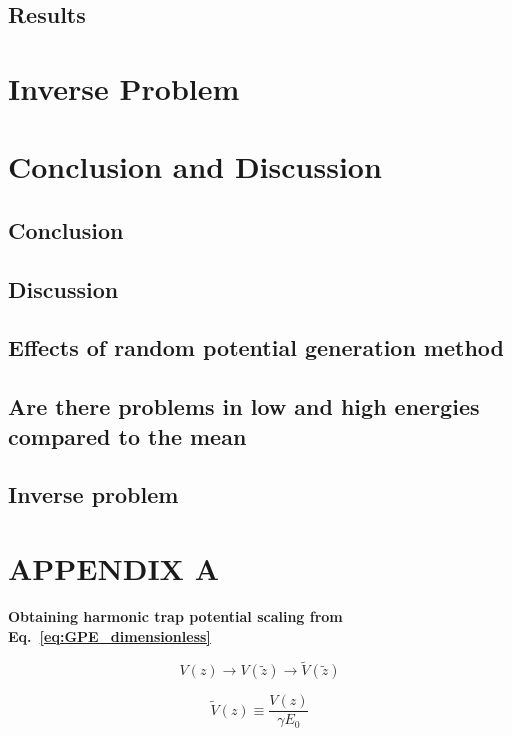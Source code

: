 \documentclass[a4paper,times,hidelinks,12pt]{article}
\begin{document}
\subsection{Results}

\section{Inverse Problem}

\clearpage
\section{Conclusion and Discussion}
\subsection{Conclusion}
\subsection{Discussion}
\subsection{Effects of random potential generation method}
\subsection{Are there problems in low and high energies compared to the mean}
\subsection{Inverse problem}


\clearpage

\clearpage




\appendix
\section{APPENDIX A}
\label{ap:scale}

\textbf{Obtaining harmonic trap potential scaling from Eq.~\eqref{eq:GPE_dimensionless}}

\begin{equation}
\label{eq:GPESCALE_harmonic_potential_transform}
    V(z) \rightarrow V(\widetilde{z}) \rightarrow \widetilde{V}(\widetilde{z})
\end{equation}

\begin{equation}
\label{eq:GPESCALE_dimensionless_harmonic_potential}
    \widetilde{V}(z) \equiv \frac{V(z)}{\gamma E_0}
\end{equation}
\end{document}
